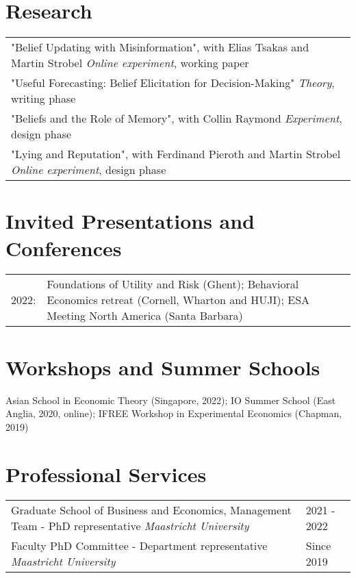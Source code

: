 \documentclass[11pt]{article}
\begin{document}
\section{Research}
\noindent\begin{tabular}{L{17cm}}
	"Belief Updating with Misinformation", with Elias Tsakas and Martin Strobel \newline  \textit{Online experiment}, working paper \\
	\rule{0pt}{4ex}"Useful Forecasting: Belief Elicitation for Decision-Making" \newline  \textit{Theory}, writing phase \\
	\rule{0pt}{4ex}"Beliefs and the Role of Memory", with Collin Raymond \newline  \textit{Experiment}, design phase \\
	\rule{0pt}{4ex}"Lying and Reputation", with Ferdinand Pieroth and Martin Strobel \newline  \textit{Online experiment}, design phase \\
\end{tabular}


\section{Invited Presentations and Conferences}

\noindent\begin{tabular}{L{1cm}L{15cm}}
	2022: &  Foundations of Utility and Risk (Ghent); Behavioral Economics retreat (Cornell, Wharton and HUJI); ESA Meeting North America (Santa Barbara)
\end{tabular}


\section{Workshops and Summer Schools}

\noindent Asian School in Economic Theory (Singapore, 2022); IO Summer School (East Anglia, 2020, online); IFREE Workshop in Experimental Economics (Chapman, 2019)


\section{Professional Services}
 
\noindent\begin{tabular}{L{14cm}L{3cm}}
	\rule{0pt}{4ex}Graduate School of Business and Economics, Management Team - PhD representative \newline \textit{Maastricht University} & 2021 - 2022   \\
	\rule{0pt}{4ex}Faculty PhD Committee - Department representative \newline \textit{Maastricht University}  & Since 2019 
\end{tabular}
\end{document}
